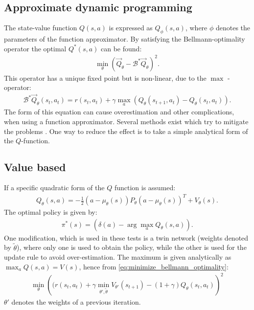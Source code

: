 \documentclass[
 reprint,
 amsmath,amssymb,amsfonts,clevref,
 aps,
prstab,
]{revtex4-2}
\begin{document}
\subsection{Approximate dynamic programming}
The state-value function $Q(s,a)$ is expressed as $Q_\phi(s,a)$, where $\phi$ denotes the parameters of the function approximator. By satisfying the Bellmann-optimality operator the optimal $Q^*(s,a)$ can be found:
\begin{align}
    \min_\theta \left(\vec Q_\theta - \mathcal{B}^*\vec Q_\theta\right)^2.\label{eq:minimize_bellmann_optimality}
\end{align}
This operator has a unique fixed point but is non-linear, due to the $\max$ - operator:
\begin{align}
 \mathcal{B}^*\vec Q_\theta(s_t,a_t) = r(s_t,a_t)+\gamma\max_a\left( Q_\theta(s_{t+1},a_t) - Q_\theta(s_t,a_t)\right).
\end{align}
The form of this equation can cause overestimation and other complications, when using a function approximator. Several methods exist which try to mitigate the problems \cite{}.
One way to reduce the effect is to take a simple analytical form of the $Q$-function.
\subsection{Value based}
If a specific quadratic form of the $Q$ function is assumed:
\begin{align}
     Q_\theta(s,a) = -\frac{1}{2}(a-\mu_\theta(s))P_\theta(a-\mu_\theta(s))^T+V_\theta(s).
\end{align}
 The optimal policy is given by:
\begin{align}
    \pi^*(s)=(\delta(a)-\arg\!\max_a Q_\theta(s,a)).
\end{align}
One modification, which is used in these tests is a twin network (weights denoted by $\tilde\theta$), where only one is used to obtain the policy, while the other is used for the update rule to avoid over-estimation.
The maximum is given analytically as $\max_a Q(s,a) = V(s)$, hence from \cref{eq:minimize_bellmann_optimality}:
\begin{align}
	\min_\theta\left( (r(s_t,a_t)+\gamma \min_{\theta\prime,\tilde \theta} V_{\theta\prime}(s_{t+1}) - (1+\gamma) Q_\theta(s_t,a_t)\right)^2
\end{align}
$\theta\prime$ denotes the weights of a previous iteration.
\end{document}
